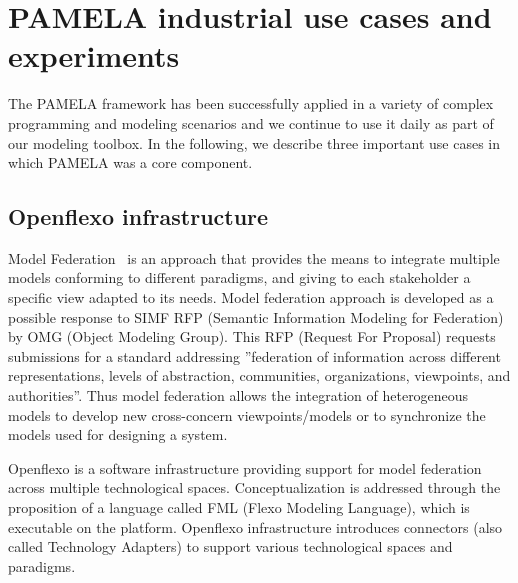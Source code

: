 


\section{PAMELA industrial use cases and experiments}
\label{sec:validation}

 The PAMELA framework has been successfully applied in a variety of complex programming and modeling scenarios and we continue to use it daily as part of our modeling toolbox. In the following, we describe three important use cases in which PAMELA was a core component.



\subsection{Openflexo infrastructure}

Model Federation~\cite{Golra2016} is an approach that provides the means to
integrate multiple models conforming to different paradigms, and giving to each
stakeholder a specific view adapted to its needs. Model federation approach is
developed as a possible response to SIMF RFP (Semantic Information Modeling for
Federation)~\cite{simf-rfp} by OMG (Object Modeling Group). This RFP (Request For Proposal)
requests submissions for a standard addressing ”federation of information
across different representations, levels of abstraction, communities,
organizations, viewpoints, and authorities”. Thus model federation allows the
integration of heterogeneous models to develop new cross-concern
viewpoints/models or to synchronize the models used for designing a system. 

Openflexo\cite{OpenflexoWebSite} is a software infrastructure providing support
for model federation across multiple technological spaces. Conceptualization is
addressed through the proposition of a language called FML (Flexo Modeling
Language), which is executable on the platform. Openflexo infrastructure
introduces connectors (also called Technology Adapters) to support various
technological spaces and paradigms.

